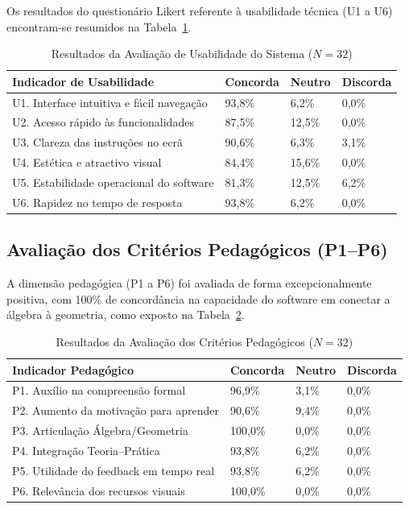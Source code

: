 \documentclass[conference]{IEEEtran}
\begin{document}
Os resultados do questionário Likert referente à usabilidade técnica (U1 a U6) encontram-se resumidos na Tabela~\ref{tab:usabilidade}.

\begin{table}[htbp]
\caption{Resultados da Avaliação de Usabilidade do Sistema ($N=32$)}
\label{tab:usabilidade}
\centering
\footnotesize
\begin{tabular}{|p{3.6cm}|p{0.85cm}|p{0.75cm}|p{0.85cm}|}
\hline
\textbf{Indicador de Usabilidade} & \textbf{Concorda} & \textbf{Neutro} & \textbf{Discorda} \\
\hline
U1. Interface intuitiva e fácil navegação & 93,8\% & 6,2\% & 0,0\% \\
\hline
U2. Acesso rápido às funcionalidades & 87,5\% & 12,5\% & 0,0\% \\
\hline
U3. Clareza das instruções no ecrã & 90,6\% & 6,3\% & 3,1\% \\
\hline
U4. Estética e atractivo visual & 84,4\% & 15,6\% & 0,0\% \\
\hline
U5. Estabilidade operacional do software & 81,3\% & 12,5\% & 6,2\% \\
\hline
U6. Rapidez no tempo de resposta & 93,8\% & 6,2\% & 0,0\% \\
\hline
\end{tabular}
\end{table}

\subsection{Avaliação dos Critérios Pedagógicos (P1--P6)}

A dimensão pedagógica (P1 a P6) foi avaliada de forma excepcionalmente positiva, com 100\% de concordância na capacidade do software em conectar a álgebra à geometria, como exposto na Tabela~\ref{tab:pedagogico}.

\begin{table}[htbp]
\caption{Resultados da Avaliação dos Critérios Pedagógicos ($N=32$)}
\label{tab:pedagogico}
\centering
\footnotesize
\begin{tabular}{|p{3.6cm}|p{0.85cm}|p{0.75cm}|p{0.85cm}|}
\hline
\textbf{Indicador Pedagógico} & \textbf{Concorda} & \textbf{Neutro} & \textbf{Discorda} \\
\hline
P1. Auxílio na compreensão formal & 96,9\% & 3,1\% & 0,0\% \\
\hline
P2. Aumento da motivação para aprender & 90,6\% & 9,4\% & 0,0\% \\
\hline
P3. Articulação Álgebra/Geometria & 100,0\% & 0,0\% & 0,0\% \\
\hline
P4. Integração Teoria--Prática & 93,8\% & 6,2\% & 0,0\% \\
\hline
P5. Utilidade do feedback em tempo real & 93,8\% & 6,2\% & 0,0\% \\
\hline
P6. Relevância dos recursos visuais & 100,0\% & 0,0\% & 0,0\% \\
\hline
\end{tabular}
\end{table}
\end{document}
